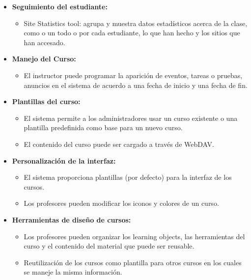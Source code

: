 	\begin{itemize}
		\item \textbf{Seguimiento del estudiante:}
			\begin{itemize}
				\item Site Statistics tool: agrupa y muestra datos estadísticos acerca de la clase, como o un todo o por cada estudiante, lo que han hecho y los sitios que han accesado.
			\end{itemize}
	\end{itemize}
	\begin{itemize}
		\item \textbf{Manejo del Curso:}
			\begin{itemize}
				\item El instructor puede programar la aparición de eventos, tareas o pruebas, anuncios en el sistema de acuerdo a una fecha de inicio y una fecha de fin.
			\end{itemize}
	\end{itemize}
	\begin{itemize}
		\item \textbf{Plantillas del curso:}
			\begin{itemize}
				\item El sistema permite a los administradores usar un curso existente o una plantilla predefinida como base para un nuevo curso.
				\item El contenido del curso puede ser cargado a través de WebDAV.
			\end{itemize}
	\end{itemize}
	\begin{itemize}
		\item \textbf{Personalización de la interfaz:}
			\begin{itemize}
				\item El sistema proporciona plantillas (por defecto) para la interfaz de los cursos.
				\item Los profesores pueden modificar los iconos y colores de un curso.
			\end{itemize}
	\end{itemize}
	\begin{itemize}
		\item \textbf{Herramientas de diseño de cursos:}
			\begin{itemize}
				\item Los profesores pueden organizar los learning objects, las herramientas del curso y el contenido del material que puede ser reusable.
				\item Reutilización de los cursos como plantilla para otros cursos en los cuales se maneje la misma información.
			\end{itemize}
	\end{itemize}

